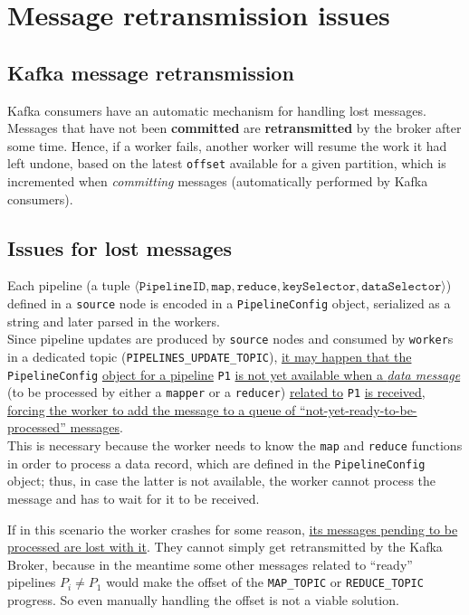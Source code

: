 \section{Message retransmission issues}
\subsection{Kafka message retransmission}
Kafka consumers have an automatic mechanism for handling lost messages. Messages that have not been \textbf{committed} are \textbf{retransmitted} by the broker after some time. Hence, if a worker fails, another worker will resume the work it had left undone, based on the latest \texttt{offset} available for a given partition, which is incremented when \textit{committing} messages (automatically performed by Kafka consumers).

\subsection{Issues for lost messages}
Each pipeline (a tuple $\langle \texttt{PipelineID}, \texttt{map}, \texttt{reduce}, \texttt{keySelector}, \texttt{dataSelector} \rangle$) defined in a \texttt{source} node is encoded in a \verb|PipelineConfig| object, serialized as a string and later parsed in the workers.\\ 
Since pipeline updates are produced by \texttt{source} nodes and consumed by \texttt{worker}s in a dedicated topic (\verb|PIPELINES_UPDATE_TOPIC|), \ul{it may happen that the} \verb|PipelineConfig| \ul{object for a pipeline} \verb|P1| \ul{is not yet available when a \textit{data message}} (to be processed by either a \texttt{mapper} or a \texttt{reducer}) \ul{related to} \verb|P1| \ul{is received}, \ul{forcing the worker to add the message to a queue of ``not-yet-ready-to-be-processed'' messages}.\\
This is necessary because the worker needs to know the \verb|map| and \verb|reduce| functions in order to process a data record, which are defined in the \verb|PipelineConfig| object;
thus, in case the latter is not available, the worker cannot process the message and has to wait for it to be received.

If in this scenario the worker crashes for some reason, \ul{its messages pending to be processed are lost with it}.
They cannot simply get retransmitted by the Kafka Broker, because in the meantime some other messages related to ``ready'' pipelines $P_i \neq P_1$ would make the offset of the \verb|MAP_TOPIC| or \verb|REDUCE_TOPIC| progress.
So even manually handling the offset is not a viable solution.

